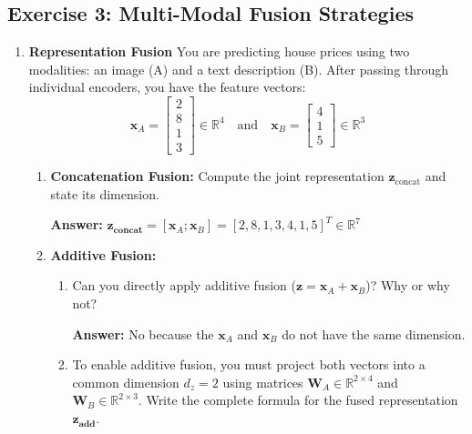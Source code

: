 \documentclass[11pt]{article}
\begin{document}
\subsection*{Exercise 3: Multi-Modal Fusion Strategies}

\begin{enumerate}[label=(\alph*)]
    \item \textbf{Representation Fusion} You are predicting house prices using two modalities: an image (A) and a text description (B). After passing through individual encoders, you have the feature vectors:
    \[
    \mathbf{x}_A = \begin{bmatrix}
        2 \\ 8 \\ 1 \\ 3
    \end{bmatrix} \in \mathbb{R}^4
    \quad \text{and} \quad
    \mathbf{x}_B = \begin{bmatrix}
        4 \\ 1 \\ 5
    \end{bmatrix} \in \mathbb{R}^3
    \]

    \begin{enumerate}[label=\arabic*.]
        \item \textbf{Concatenation Fusion:} Compute the joint representation \(\mathbf{z}_\text{concat}\) and state its dimension.

        \textbf{Answer:} \(\mathbf{z_\text{concat}} = \left[\mathbf{x}_A; \mathbf{x}_B\right] = \left[2, 8, 1, 3, 4, 1, 5\right]^T \in \mathbb{R}^7\)

        \item \textbf{Additive Fusion:}
        \begin{enumerate}[label=(\alph*)]
            \item Can you directly apply additive fusion (\(\mathbf{z} = \mathbf{x}_A + \mathbf{x}_B\))? Why or why not?
            
            \textbf{Answer:} No because the \(\mathbf{x}_A\) and \(\mathbf{x}_B\) do not have the same dimension.

            \item To enable additive fusion, you must project both vectors into a common dimension \(d_z = 2\) using matrices \(\mathbf{W}_A \in \mathbb{R}^{2 \times 4}\) and \(\mathbf{W}_B \in \mathbb{R}^{2 \times 3}\).
            Write the complete formula for the fused representation \(\mathbf{z_\text{add}}\).


\end{enumerate}
\end{enumerate}
\end{enumerate}
\end{document}
